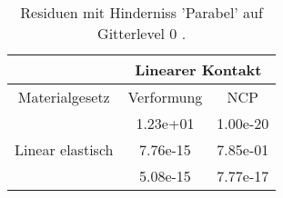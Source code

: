 \begin{table} 
\centering 
\begin{tabular}{c|cc|} 
\cline{2-3} 
 & \multicolumn{2}{|c|}{Linearer Kontakt} \\ 
\hline 
\multicolumn{1}{|c|}{Materialgesetz} & \multicolumn{1}{c|}{Verformung} & \multicolumn{1}{c|}{NCP} \\ 
\hline 
\multicolumn{1}{|c|}{\multirow{3}{*}{Linear elastisch}} &\multicolumn{1}{|c|}{  1.23e+01} & \multicolumn{1}{|c|}{  1.00e-20} \\ 
\multicolumn{1}{|c|}{} & \multicolumn{1}{|c|}{  7.76e-15} & \multicolumn{1}{|c|}{  7.85e-01} \\ 
\multicolumn{1}{|c|}{} & \multicolumn{1}{|c|}{  5.08e-15} & \multicolumn{1}{|c|}{  7.77e-17} \\ 
\hline 
\end{tabular}\caption{Residuen mit Hinderniss 'Parabel' auf Gitterlevel 0 .}\label{tab:Residuum_Parabel_level0}
\end{table} 
